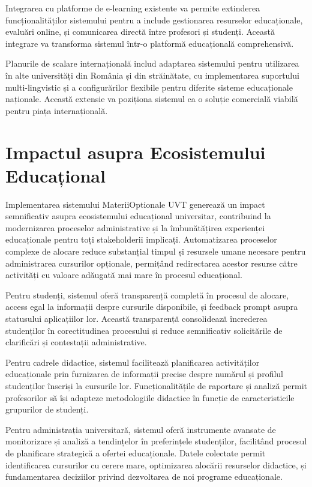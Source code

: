 \documentclass[12pt,a4paper]{report}
\begin{document}
Integrarea cu platforme de e-learning existente va permite extinderea funcționalităților sistemului pentru a include gestionarea resurselor educaționale, evaluări online, și comunicarea directă între profesori și studenți. Această integrare va transforma sistemul într-o platformă educațională comprehensivă.

Planurile de scalare internațională includ adaptarea sistemului pentru utilizarea în alte universități din România și din străinătate, cu implementarea suportului multi-lingvistic și a configurărilor flexibile pentru diferite sisteme educaționale naționale. Această extensie va poziționa sistemul ca o soluție comercială viabilă pentru piața internațională.
 
\section{Impactul asupra Ecosistemului Educațional}

Implementarea sistemului MateriiOptionale UVT generează un impact semnificativ asupra ecosistemului educațional universitar, contribuind la modernizarea proceselor administrative și la îmbunătățirea experienței educaționale pentru toți stakeholderii implicați. Automatizarea proceselor complexe de alocare reduce substanțial timpul și resursele umane necesare pentru administrarea cursurilor opționale, permițând redirectarea acestor resurse către activități cu valoare adăugată mai mare în procesul educațional.

Pentru studenți, sistemul oferă transparență completă în procesul de alocare, access egal la informații despre cursurile disponibile, și feedback prompt asupra statusului aplicațiilor lor. Această transparență consolidează încrederea studenților în corectitudinea procesului și reduce semnificativ solicitările de clarificări și contestații administrative.

Pentru cadrele didactice, sistemul facilitează planificarea activităților educaționale prin furnizarea de informații precise despre numărul și profilul studenților înscriși la cursurile lor. Funcționalitățile de raportare și analiză permit profesorilor să își adapteze metodologiile didactice în funcție de caracteristicile grupurilor de studenți.

Pentru administrația universitară, sistemul oferă instrumente avansate de monitorizare și analiză a tendințelor în preferințele studenților, facilitând procesul de planificare strategică a ofertei educaționale. Datele colectate permit identificarea cursurilor cu cerere mare, optimizarea alocării resurselor didactice, și fundamentarea deciziilor privind dezvoltarea de noi programe educaționale.
\end{document}
